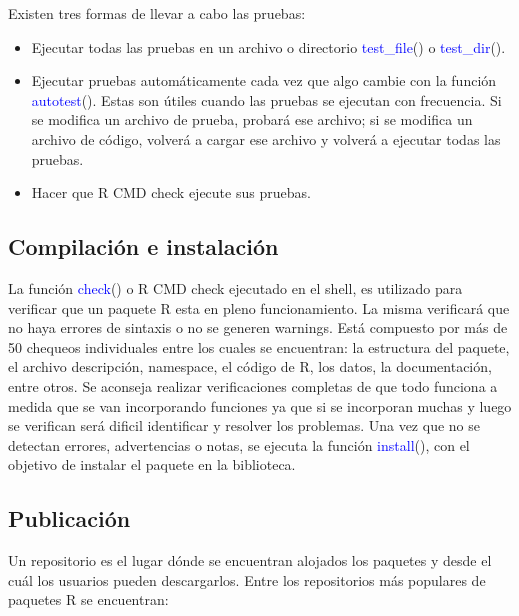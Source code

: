 Existen tres formas de llevar a cabo las pruebas:
\begin{itemize}
\item Ejecutar todas las pruebas en un archivo o directorio \textcolor{blue}{test\_file}() o \textcolor{blue}{test\_dir}().
\item Ejecutar pruebas automáticamente cada vez que algo cambie con la función \textcolor{blue}{autotest}(). Estas son útiles cuando las pruebas se ejecutan con frecuencia. Si se modifica un archivo de prueba, probará ese archivo; si se modifica un archivo de código, volverá a cargar ese archivo y volverá a ejecutar todas las pruebas.
\item Hacer que R CMD check ejecute sus pruebas.
\end{itemize}


\subsection{Compilación e instalación}

La función \textcolor{blue}{check}() o R CMD check ejecutado en el shell, es utilizado para verificar que un paquete R esta en pleno funcionamiento. La misma verificará que no haya errores de sintaxis o no se generen warnings. Está compuesto por más de 50 chequeos individuales entre los cuales se encuentran: la estructura del paquete, el archivo descripción, namespace, el código de R, los datos, la documentación, entre otros. Se aconseja realizar verificaciones completas de que todo funciona a medida que se van incorporando funciones ya que si se incorporan muchas y luego se verifican será dificil identificar y resolver los problemas. Una vez que no se detectan errores, advertencias o notas, se ejecuta la función \textcolor{blue}{install}(), con el objetivo de instalar el paquete en la biblioteca.


\subsection{Publicación}
Un repositorio es el lugar dónde se encuentran alojados los paquetes y desde el cuál los usuarios pueden descargarlos. Entre los repositorios más populares de paquetes R se encuentran:

